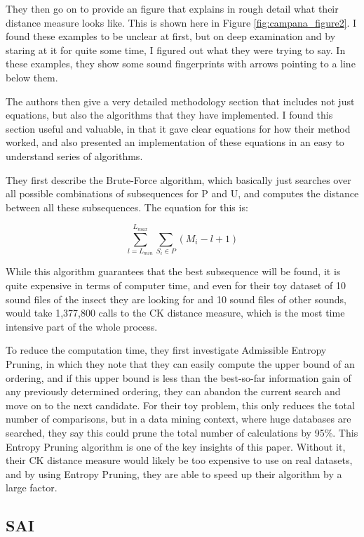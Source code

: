 They then go on to provide an figure that explains in rough detail
what their distance measure looks like.  This is shown here in Figure
\ref{fig:campana_figure2}.  I found these examples to be unclear at
first, but on deep examination and by staring at it for quite some
time, I figured out what they were trying to say.  In these examples,
they show some sound fingerprints with arrows pointing to a line below
them.

The authors then give a very detailed methodology section that
includes not just equations, but also the algorithms that they have
implemented.  I found this section useful and valuable, in that it
gave clear equations for how their method worked, and also presented
an implementation of these equations in an easy to understand series
of algorithms.

They first describe the Brute-Force algorithm, which basically just
searches over all possible combinations of subsequences for P and U,
and computes the distance between all these subsequences.  The
equation for this is:

\[ \sum^{L_{max}}_{l=L_{min}} \sum_{S_i \in { P }} (M_i - l + 1) \]

While this algorithm guarantees that the best subsequence will be
found, it is quite expensive in terms of computer time, and even for
their toy dataset of 10 sound files of the insect they are looking for
and 10 sound files of other sounds, would take 1,377,800 calls to the
CK distance measure, which is the most time intensive part of the
whole process.

To reduce the computation time, they first investigate Admissible
Entropy Pruning, in which they note that they can easily compute the
upper bound of an ordering, and if this upper bound is less than the
best-so-far information gain of any previously determined ordering,
they can abandon the current search and move on to the next candidate.
For their toy problem, this only reduces the total number of
comparisons, but in a data mining context, where huge databases are
searched, they say this could prune the total number of calculations
by 95\%.  This Entropy Pruning algorithm is one of the key insights of
this paper.  Without it, their CK distance measure would likely be too
expensive to use on real datasets, and by using Entropy Pruning, they
are able to speed up their algorithm by a large factor.

\subsection{SAI}


